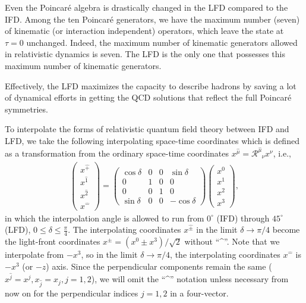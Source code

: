 \documentclass[%
 reprint,
superscriptaddress,
 amsmath,amssymb,
 aps,
]{revtex4-2}
\newcommand{\muT}{\hat{\mu}}
\newcommand{\itP}[1]{\hat{#1}}
\begin{document}
Even the Poincar\'e algebra is drastically changed in the LFD compared to the IFD.
Among the ten Poincar\'e generators, we have the maximum number (seven) of kinematic (or interaction independent) operators, which leave the state at $\tau=0$ unchanged. Indeed, the maximum number of kinematic generators allowed in relativistic dynamics is seven. The LFD is the only one that possesses this maximum number of kinematic generators.

Effectively, the LFD maximizes the capacity to
describe hadrons by saving a lot of dynamical efforts in getting the QCD solutions that reflect the full Poincar\'e symmetries.

To interpolate the forms of relativistic quantum field theory between IFD and LFD, we take the following interpolating space-time coordinates  \cite{Ji2001, Hornbostel1992, Ji1996, Ji2012, Ji2015EM, Ji2015SP, Ji2018QED, Ji2021QCD} which is defined as a transformation from the ordinary space-time coordinates $x^{\muT}=\mathcal{R}^{\muT}_{\phantom{\mu}{\nu}}x^{\nu}$, i.e.,
\begin{align}\label{eqn:interpolation_angle_definition}
  \begin{pmatrix}
    x^{\hat{+}}\\
    x^{\hat{1}}\\
    x^{\hat{2}}\\
    x^{\hat{-}}
  \end{pmatrix}=
  \begin{pmatrix}
    \cos\delta & 0  & 0  & \sin\delta \\
    0          & 1  & 0  & 0 \\
    0          & 0  & 1  & 0 \\
    \sin\delta & 0  & 0  & -\cos\delta
  \end{pmatrix}
  \begin{pmatrix}
    x^{0}\\
    x^{1}\\
    x^{2}\\
    x^{3}
  \end{pmatrix},
\end{align}
in which the interpolation angle is allowed to run from $0^\circ$ (IFD) through $45^\circ$ (LFD), $0\le \delta \le \frac{\pi}{4}$. The interpolating coordinates $x^{\itP{\pm}}$ in the limit $\delta\rightarrow\pi/4$ become the light-front coordinates $x^{\pm}=(x^{0}\pm x^{3})/\sqrt{2}$ without  ``\textasciicircum''. Note that we interpolate from $-x^3$, so in the limit $\delta\rightarrow\pi/4$, the interpolating coordinates $x^{\itP{-}}$ is $-x^3$ (or $-z$) axis. Since the perpendicular components remain the same ($x^{\itP{j}}=x^{j},x_{\itP{j}}=x_{j}, j=1,2$), we will omit the ``\textasciicircum''  notation unless necessary from now on for the perpendicular indices $j=1,2$ in a four-vector.
\end{document}
